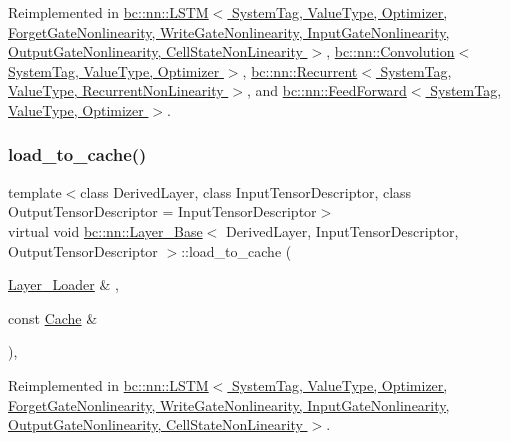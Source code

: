 Reimplemented in \hyperlink{structbc_1_1nn_1_1LSTM_ae85ec6a90fe555a1088681159a0af466}{bc\+::nn\+::\+L\+S\+T\+M$<$ System\+Tag, Value\+Type, Optimizer, Forget\+Gate\+Nonlinearity, Write\+Gate\+Nonlinearity, Input\+Gate\+Nonlinearity, Output\+Gate\+Nonlinearity, Cell\+State\+Non\+Linearity $>$}, \hyperlink{structbc_1_1nn_1_1Convolution_afb8adcb9bfa9854fba8b609987ff8809}{bc\+::nn\+::\+Convolution$<$ System\+Tag, Value\+Type, Optimizer $>$}, \hyperlink{structbc_1_1nn_1_1Recurrent_aa2b86788ec2841005afb5209b7eb7282}{bc\+::nn\+::\+Recurrent$<$ System\+Tag, Value\+Type, Recurrent\+Non\+Linearity $>$}, and \hyperlink{structbc_1_1nn_1_1FeedForward_a8fccd9e87dda10e01e74732ad8c71f3d}{bc\+::nn\+::\+Feed\+Forward$<$ System\+Tag, Value\+Type, Optimizer $>$}.

\mbox{\label{structbc_1_1nn_1_1Layer__Base_a6f479e0d594eca051dff122cdb3fe2a1}} 
\subsubsection{\texorpdfstring{load\+\_\+to\+\_\+cache()}{load\_to\_cache()}}
{\footnotesize\ttfamily template$<$class Derived\+Layer, class Input\+Tensor\+Descriptor, class Output\+Tensor\+Descriptor = Input\+Tensor\+Descriptor$>$ \\
virtual void \hyperlink{structbc_1_1nn_1_1Layer__Base}{bc\+::nn\+::\+Layer\+\_\+\+Base}$<$ Derived\+Layer, Input\+Tensor\+Descriptor, Output\+Tensor\+Descriptor $>$\+::load\+\_\+to\+\_\+cache (\begin{DoxyParamCaption}\item[{\hyperlink{structbc_1_1nn_1_1Layer__Loader}{Layer\+\_\+\+Loader} \&}]{,  }\item[{const \hyperlink{structbc_1_1nn_1_1Cache}{Cache} \&}]{ }\end{DoxyParamCaption})\hspace{0.3cm}{\ttfamily [inline]}, {\ttfamily [virtual]}}



Reimplemented in \hyperlink{structbc_1_1nn_1_1LSTM_a145581143a450d11a870b3c59cc1d47f}{bc\+::nn\+::\+L\+S\+T\+M$<$ System\+Tag, Value\+Type, Optimizer, Forget\+Gate\+Nonlinearity, Write\+Gate\+Nonlinearity, Input\+Gate\+Nonlinearity, Output\+Gate\+Nonlinearity, Cell\+State\+Non\+Linearity $>$}.

